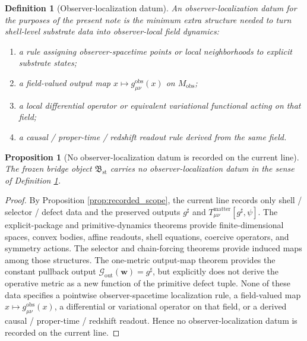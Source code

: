\documentclass[11pt]{article}
\newcommand{\StableBridgeObject}{\mathfrak B_{\mathrm{st}}}
\newcommand{\FixedMetric}{g^{\sharp}}
\newcommand{\MetricOut}{\mathscr G_{\mathrm{out}}}
\newcommand{\ObsMan}{M_{\mathrm{obs}}}
\newtheorem{definition}{Definition}
\newtheorem{proposition}{Proposition}
\begin{document}
\begin{definition}[Observer-localization datum]
\label{def:localization}
An \emph{observer-localization datum} for the purposes of the present note is the minimum extra structure needed to turn shell-level substrate data into observer-local field dynamics:
\begin{enumerate}
    \item a rule assigning observer-spacetime points or local neighborhoods to explicit substrate states;
    \item a field-valued output map \(x\mapsto g_{\mu\nu}^{\mathrm{obs}}(x)\) on \(\ObsMan\);
    \item a local differential operator or equivalent variational functional acting on that field;
    \item a causal / proper-time / redshift readout rule derived from the same field.
\end{enumerate}
\end{definition}

\begin{proposition}[No observer-localization datum is recorded on the current line]
\label{prop:no_localization}
The frozen bridge object \(\StableBridgeObject\) carries no observer-localization datum in the sense of Definition \ref{def:localization}.
\end{proposition}

\begin{proof}
By Proposition \ref{prop:recorded_scope}, the current line records only shell / selector / defect data and the preserved outputs \(\FixedMetric\) and \(T_{\mu\nu}^{\mathrm{matter}}[\FixedMetric,\psi]\). The explicit-package and primitive-dynamics theorems provide finite-dimensional spaces, convex bodies, affine readouts, shell equations, coercive operators, and symmetry actions. The selector and chain-forcing theorems provide induced maps among those structures. The one-metric output-map theorem provides the constant pullback output \(\MetricOut(\mathbf w)=\FixedMetric\), but explicitly does not derive the operative metric as a new function of the primitive defect tuple. None of these data specifies a pointwise observer-spacetime localization rule, a field-valued map \(x\mapsto g_{\mu\nu}^{\mathrm{obs}}(x)\), a differential or variational operator on that field, or a derived causal / proper-time / redshift readout. Hence no observer-localization datum is recorded on the current line.
\end{proof}
\end{document}
